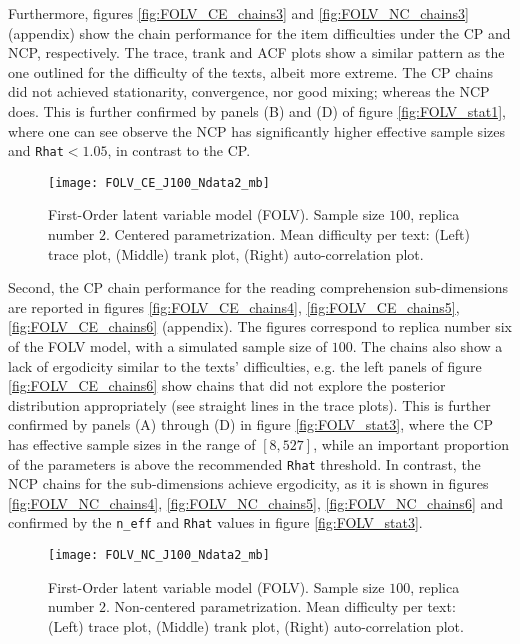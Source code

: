 Furthermore, figures \ref{fig:FOLV_CE_chains3} and \ref{fig:FOLV_NC_chains3} (appendix) show the chain performance for the item difficulties under the CP and NCP, respectively. The trace, trank and ACF plots show a similar pattern as the one outlined for the difficulty of the texts, albeit more extreme. The CP chains did not achieved stationarity, convergence, nor good mixing; whereas the NCP does. This is further confirmed by panels (B) and (D) of figure \ref{fig:FOLV_stat1}, where one can see observe the NCP has significantly higher effective sample sizes and \texttt{Rhat}$<1.05$, in contrast to the CP.
%
\begin{figure}[H]
	\centering
	\texttt{[image: FOLV\_CE\_J100\_Ndata2\_mb]}
	\caption[First-Order latent variable model (FOLV). Sample size $100$, replica number $2$. Centered parametrization. Mean difficulty per text. Trace, trank and auto-correlation plots.]%
	{First-Order latent variable model (FOLV). Sample size $100$, replica number $2$. Centered parametrization. Mean difficulty per text: (Left) trace plot, (Middle) trank plot, (Right) auto-correlation plot.}
	\label{fig:FOLV_CE_chains1}
\end{figure}

Second, the CP chain performance for the reading comprehension sub-dimensions are reported in figures \ref{fig:FOLV_CE_chains4}, \ref{fig:FOLV_CE_chains5}, \ref{fig:FOLV_CE_chains6} (appendix). The figures correspond to replica number six of the FOLV model, with a simulated sample size of $100$. The chains also show a lack of ergodicity similar to the texts' difficulties, e.g. the left panels of figure \ref{fig:FOLV_CE_chains6} show chains that did not explore the posterior distribution appropriately (see straight lines in the trace plots). This is further confirmed by panels (A) through (D) in figure \ref{fig:FOLV_stat3}, where the CP has effective sample sizes in the range of $[8, 527]$, while an important proportion of the parameters is above the recommended \texttt{Rhat} threshold. In contrast, the NCP chains for the sub-dimensions achieve ergodicity, as it is shown in figures \ref{fig:FOLV_NC_chains4}, \ref{fig:FOLV_NC_chains5}, \ref{fig:FOLV_NC_chains6} and confirmed by the \texttt{n\_eff} and \texttt{Rhat} values in figure \ref{fig:FOLV_stat3}.
%
\begin{figure}[H]
	\centering
	\texttt{[image: FOLV\_NC\_J100\_Ndata2\_mb]}
	\caption[First-Order latent variable model (FOLV). Sample size $100$, replica number $2$. Non-centered parametrization. Mean difficulty per text. Trace, trank and auto-correlation plots.]%
	{First-Order latent variable model (FOLV). Sample size $100$, replica number $2$. Non-centered parametrization. Mean difficulty per text: (Left) trace plot, (Middle) trank plot, (Right) auto-correlation plot.}
	\label{fig:FOLV_NC_chains1}
\end{figure}

